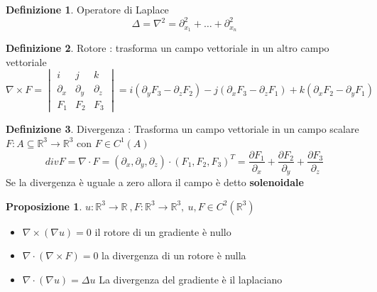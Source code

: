 \documentclass{article}
\theoremstyle{definition}
\newtheorem*{definizione}{Definizione}
\newtheorem*{proposizione}{Proposizione}
\newcommand{\R}{\mathbb{R}}
\begin{document}
	\begin{definizione}
		Operatore di Laplace  \\
		$$\Delta=\nabla^2=\partial^2_{x_1}+\dots+\partial^2_{x_n} $$
	\end{definizione}
	
	\begin{definizione}
		Rotore : trasforma un campo vettoriale in un altro campo vettoriale \\
		$$\nabla \times F=\begin{vmatrix}
			i & j & k \\
			\partial_x & \partial_y & \partial_z \\
			F_1 & F_2 & F_3 
		\end{vmatrix}= i(\partial_yF_3 -\partial_zF_2)-j(\partial_xF_3 -\partial_zF_1)+k(\partial_xF_2-\partial_yF_1)$$
	\end{definizione}
	\begin{definizione}
		Divergenza : Trasforma un campo vettoriale in un campo scalare\\
		$F:A\subseteq \R^3 \rightarrow \R^3$ con $F\in C^1(A)$ 
		$$divF=\nabla \cdot F=(\partial_x,\partial_y,\partial_z)\cdot(F_1,F_2,F_3)^T=\frac{\partial F_1}{\partial_x}+\frac{\partial F_2}{\partial_y}+\frac{\partial F_3}{\partial_z}$$
		Se la divergenza è uguale a zero allora il campo è detto \textbf{solenoidale} 
	\end{definizione}
	\begin{proposizione}
		$u:\R^3 \rightarrow \R \ , F:\R^3 \rightarrow \R^3 , \ u,F\in C^2(\R^3)$
		\begin{itemize}
			\item $\nabla \times (\nabla u)=0$ il rotore di un gradiente è nullo 
			\item $\nabla \cdot (\nabla \times F)=0$ la divergenza di un rotore è nulla 
			\item $\nabla \cdot (\nabla u)=\Delta u$ La divergenza del gradiente è il laplaciano 
		\end{itemize}
	\end{proposizione}
\end{document}
